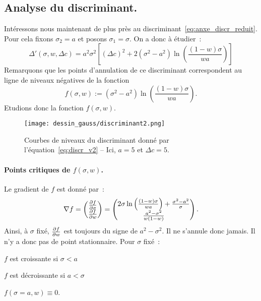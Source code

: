 \documentclass[main.tex]{subfiles}
\begin{document}
\subsection*{Analyse du discriminant.}
Intéressons nous maintenant de plus près au discriminant~\eqref{eq:anxe_discr_reduit}. Pour cela fixons $\sigma_2=a$ et posons $\sigma_1=\sigma$. On a donc à étudier~:
\begin{equation}\label{eq:discr_v2}
\Delta'(\sigma,w,\Delta c) = a^2 \sigma^2 \left[ (\Delta c)^2 + 2(\sigma^2-a^2)\ln\left( \frac{(1-w)\sigma}{wa} \right) \right]
\end{equation}
Remarquons que les points d'annulation de ce discriminant correspondent au ligne de niveaux négatives de la fonction
$$f( \sigma,w ) := (\sigma^2-a^2)\ln\left( \frac{(1-w)\sigma}{wa} \right). $$
Etudions donc la fonction $f( \sigma,w )$.

\begin{figure}
\centering
\texttt{[image: dessin\_gauss/discriminant2.png]}
\vspace{-5mm}
\caption{\label{fig:courbe_nvx_discrim}Courbes de niveaux du discriminant donné par l'équation~\eqref{eq:discr_v2} -- Ici, $a=5$ et $\Delta c=5$.}
\end{figure}
\paragraph{Points critiques de $f( \sigma,w )$.}
Le gradient de $f$ est donné par~:
\begin{equation}
\nabla f = \begin{pmatrix}
\frac{\partial f}{\partial \sigma} \\ \frac{\partial f}{\partial w}
\end{pmatrix}=\begin{pmatrix}
2\sigma \ln\left( \frac{(1-w)\sigma}{wa} \right) + \frac{\sigma^2-a^2}{\sigma}\\ \frac{a^2-\sigma^2}{w(1-w)}
\end{pmatrix}.
\end{equation}
Ainsi, à $\sigma$ fixé, $\frac{\partial f}{\partial w}$ est toujours du signe de $a^2-\sigma^2$. Il ne s'annule donc jamais. Il n'y a donc pas de point stationnaire. Pour $\sigma$ fixé~:
\begin{myitemize}
\item $f$ est croissante si $\sigma < a$
\item $f$ est décroissante si $a<\sigma$
\item $f(\sigma=a, w) \equiv 0$.
\end{myitemize}
\end{document}
